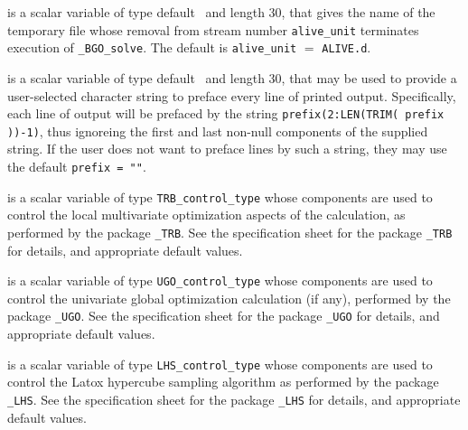 \documentclass{galahad}
\newcommand{\packagename}{BGO}
\newcommand{\fullpackagename}{\libraryname\_\packagename}
\newcommand{\solver}{{\tt \fullpackagename\_solve}}
\begin{document}
\begin{description}
 is a scalar variable of type default \character\ and length
30, that gives the name of the temporary file whose removal from stream number
{\tt alive\_unit} terminates execution of \solver.
The default is {\tt alive\_unit} $=$ {\tt ALIVE.d}.

 is a scalar variable of type default \character\
and length 30, that may be used to provide a user-selected
character string to preface every line of printed output.
Specifically, each line of output will be prefaced by the string
{\tt prefix(2:LEN(TRIM( prefix ))-1)},
thus ignoreing the first and last non-null components of the
supplied string. If the user does not want to preface lines by such
a string, they may use the default {\tt prefix = ""}.

 is a scalar variable of type
{\tt TRB\_control\_type}
whose components are used to control the local multivariate
optimization aspects of the calculation, as performed by the package
{\tt \libraryname\_TRB}.
See the specification sheet for the package
{\tt \libraryname\_TRB}
for details, and appropriate default values.

 is a scalar variable of type
{\tt UGO\_control\_type}
whose components are used to control the
univariate global optimization calculation (if any),
performed by the package
{\tt \libraryname\_UGO}.
See the specification sheet for the package
{\tt \libraryname\_UGO}
for details, and appropriate default values.

 is a scalar variable of type
{\tt LHS\_control\_type}
whose components are used to control the Latox hypercube sampling algorithm
as performed by the package
{\tt \libraryname\_LHS}.
See the specification sheet for the package
{\tt \libraryname\_LHS}
for details, and appropriate default values.

\end{description}

\end{document}
